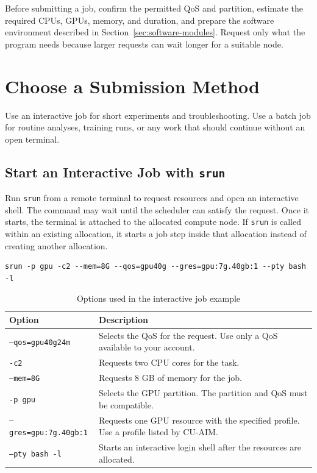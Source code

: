 \documentclass[11pt,oneside]{memoir}
\begin{document}
Before submitting a job, confirm the permitted QoS and partition, estimate the required CPUs, GPUs, memory, and duration, and prepare the software environment described in Section~\ref{sec:software-modules}. Request only what the program needs because larger requests can wait longer for a suitable node.

\section{Choose a Submission Method}
\label{sec:job-submissions}
Use an interactive job for short experiments and troubleshooting. Use a batch job for routine analyses, training runs, or any work that should continue without an open terminal.

\subsection{Start an Interactive Job with \texttt{srun}}
\label{subsec:interactive-srun}

Run \texttt{srun} from a remote terminal to request resources and open an interactive shell. The command may wait until the scheduler can satisfy the request. Once it starts, the terminal is attached to the allocated compute node. If \texttt{srun} is called within an existing allocation, it starts a job step inside that allocation instead of creating another allocation.

\begin{lstlisting}[style = terminal]
srun -p gpu -c2 --mem=8G --qos=gpu40g --gres=gpu:7g.40gb:1 --pty bash -l
\end{lstlisting}
\begin{table}[ht]
\centering
\begin{tabular}{|l|p{10cm}|}
\hline
\textbf{Option} & \textbf{Description} \\ \hline

\texttt{--qos=gpu40g24m} &
Selects the QoS for the request. Use only a QoS available to your account. \\ \hline

\texttt{-c2} &
Requests two CPU cores for the task. \\ \hline

\texttt{--mem=8G} &
Requests 8 GB of memory for the job. \\ \hline

\texttt{-p gpu} &
Selects the GPU partition. The partition and QoS must be compatible. \\ \hline

\texttt{--gres=gpu:7g.40gb:1} &
Requests one GPU resource with the specified profile. Use a profile listed by CU-AIM. \\ \hline

\texttt{--pty bash -l} &
Starts an interactive login shell after the resources are allocated. \\ \hline

\end{tabular}
\caption{Options used in the interactive job example}
\label{tab:job-submission-options}
\end{table}
\end{document}
